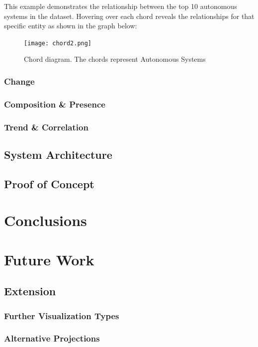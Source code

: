 \documentclass[16pt]{extreport}
\begin{document}
\parbox{\linewidth}{
\justify
\large{
This example demonstrates the relationship between the top 10 autonomous systems in the dataset. Hovering over each chord reveals the relationships for that specific entity as shown in the graph below:
}}

\begin{center}
	\begin{figure}[h]
		\centering
		\texttt{[image: chord2.png]}
		\caption[]{Chord diagram. The chords represent Autonomous Systems}
		\label{fig:det}
	\end{figure}
\end{center}

\clearpage



\subsection{Change}
\subsection{Composition \& Presence}
\subsection{Trend \& Correlation}
\section{System Architecture}
\section{Proof of Concept}

\chapter{Conclusions}
\chapter{Future Work}
\section{Extension} 
\subsection{Further Visualization Types}
\subsection{Alternative Projections}
\end{document}
